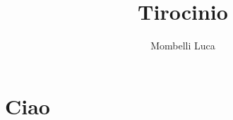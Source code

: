 \documentclass{report}
\title{Tirocinio}
\author{Mombelli Luca}
\begin{document}
	\maketitle
	\tableofcontents
	\section{Ciao}
\end{document}
